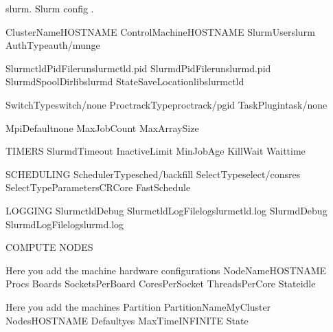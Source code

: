 \documentclass[letterpaper,10pt,english]{sphinxmanual}
\begin{document}
%
\begin{sphinxVerbatim}[commandchars=\\\{\}]
\PYGZsh{}\PYGZsh{}\PYGZsh{} slurm.  Slurm config .

\PYGZsh{}ClusterName\PYGZdl{}HOST\PYGZus{}NAME
ControlMachine\PYGZdl{}HOST\PYGZus{}NAME
SlurmUserslurm
AuthTypeauth/munge

SlurmctldPidFilerunslurmctld.pid
SlurmdPidFilerunslurmd.pid
SlurmdSpoolDirlibslurmd
StateSaveLocationlibslurmctld

SwitchTypeswitch/none
ProctrackTypeproctrack/pgid
TaskPlugintask/none

MpiDefaultnone
MaxJobCount
MaxArraySize

\PYGZsh{} TIMERS
SlurmdTimeout
InactiveLimit
MinJobAge
KillWait
Waittime

\PYGZsh{} SCHEDULING
SchedulerTypesched/backfill
SelectTypeselect/cons\PYGZus{}res
SelectTypeParametersCR\PYGZus{}Core
FastSchedule

\PYGZsh{} LOGGING
SlurmctldDebug
SlurmctldLogFilelogslurmctld.log
SlurmdDebug
SlurmdLogFilelogslurmd.log

\PYGZsh{} COMPUTE NODES

\PYGZsh{} Here you add the machine hardware configurations
NodeName\PYGZdl{}HOST\PYGZus{}NAME Procs Boards SocketsPerBoard CoresPerSocket ThreadsPerCore Stateidle

\PYGZsh{} Here you add the machines   Partition
PartitionNameMyCluster Nodes\PYGZdl{}HOST\PYGZus{}NAME Defaultyes MaxTimeINFINITE State
\end{sphinxVerbatim}
\end{document}
